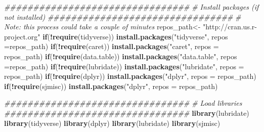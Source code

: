 \documentclass[]{article}
\newenvironment{Shaded}{\begin{snugshade}}{\end{snugshade}}
\newcommand{\CommentTok}[1]{\textcolor[rgb]{0.56,0.35,0.01}{\textit{#1}}}
\newcommand{\ControlFlowTok}[1]{\textcolor[rgb]{0.13,0.29,0.53}{\textbf{#1}}}
\newcommand{\DataTypeTok}[1]{\textcolor[rgb]{0.13,0.29,0.53}{#1}}
\newcommand{\KeywordTok}[1]{\textcolor[rgb]{0.13,0.29,0.53}{\textbf{#1}}}
\newcommand{\NormalTok}[1]{#1}
\newcommand{\OperatorTok}[1]{\textcolor[rgb]{0.81,0.36,0.00}{\textbf{#1}}}
\newcommand{\StringTok}[1]{\textcolor[rgb]{0.31,0.60,0.02}{#1}}
\begin{document}
\begin{Shaded}
\begin{Highlighting}[]
\CommentTok{################################}
\CommentTok{#  Install packages (if not installed)}
\CommentTok{################################}
\CommentTok{# Note: this process could take a couple of minutes}
\NormalTok{repos_path<-}\StringTok{ "http://cran.us.r-project.org"}
\ControlFlowTok{if}\NormalTok{(}\OperatorTok{!}\KeywordTok{require}\NormalTok{(tidyverse)) }\KeywordTok{install.packages}\NormalTok{(}\StringTok{"tidyverse"}\NormalTok{, }\DataTypeTok{repos =}\NormalTok{repos_path)}
\ControlFlowTok{if}\NormalTok{(}\OperatorTok{!}\KeywordTok{require}\NormalTok{(caret)) }\KeywordTok{install.packages}\NormalTok{(}\StringTok{"caret"}\NormalTok{, }\DataTypeTok{repos =}\NormalTok{ repos_path)}
\ControlFlowTok{if}\NormalTok{(}\OperatorTok{!}\KeywordTok{require}\NormalTok{(data.table)) }\KeywordTok{install.packages}\NormalTok{(}\StringTok{"data.table"}\NormalTok{, }\DataTypeTok{repos =}\NormalTok{repos_path)}
\ControlFlowTok{if}\NormalTok{(}\OperatorTok{!}\KeywordTok{require}\NormalTok{(lubridate)) }\KeywordTok{install.packages}\NormalTok{(}\StringTok{"lubridate"}\NormalTok{, }\DataTypeTok{repos =}\NormalTok{ repos_path)}
\ControlFlowTok{if}\NormalTok{(}\OperatorTok{!}\KeywordTok{require}\NormalTok{(dplyr)) }\KeywordTok{install.packages}\NormalTok{(}\StringTok{"dplyr"}\NormalTok{, }\DataTypeTok{repos =}\NormalTok{ repos_path)}
\ControlFlowTok{if}\NormalTok{(}\OperatorTok{!}\KeywordTok{require}\NormalTok{(sjmisc)) }\KeywordTok{install.packages}\NormalTok{(}\StringTok{"dplyr"}\NormalTok{, }\DataTypeTok{repos =}\NormalTok{ repos_path)}

\CommentTok{################################}
\CommentTok{# Load libraries}
\CommentTok{################################}
\KeywordTok{library}\NormalTok{(lubridate)}
\KeywordTok{library}\NormalTok{(tidyverse)}
\KeywordTok{library}\NormalTok{(dplyr)}
\KeywordTok{library}\NormalTok{(lubridate)}
\KeywordTok{library}\NormalTok{(sjmisc)}
\end{Highlighting}
\end{Shaded}
\end{document}
